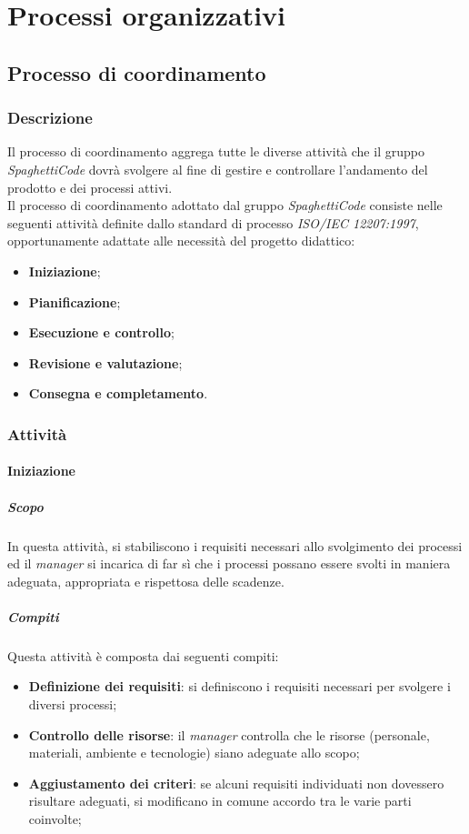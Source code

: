 \section{Processi organizzativi}
\label{sec:processi_organizativi}

\subsection{Processo di coordinamento}

\subsubsection{Descrizione}
Il processo di coordinamento aggrega tutte le diverse attività che il gruppo \emph{SpaghettiCode} dovrà svolgere al fine di gestire e controllare l'andamento del prodotto e dei processi attivi.\\

Il processo di coordinamento adottato dal gruppo \emph{SpaghettiCode} consiste nelle seguenti attività definite dallo standard di processo \emph{ISO/IEC 12207:1997}, opportunamente adattate alle necessità del progetto didattico:
\begin{itemize}
    \item \textbf{Iniziazione};
    \item \textbf{Pianificazione};
    \item \textbf{Esecuzione e controllo};
    \item \textbf{Revisione e valutazione};
    \item \textbf{Consegna e completamento}.
\end{itemize}

\subsubsection{Attività}


\paragraph{Iniziazione}
\label{par:iniziazione}
\subparagraph{Scopo}
\label{par:iniziazione:scopo}
In questa attività, si stabiliscono i requisiti necessari allo svolgimento dei processi ed il \emph{manager} si incarica di far sì che i processi possano essere svolti in maniera adeguata, appropriata e rispettosa delle scadenze.\\
\subparagraph{Compiti}
\label{par:iniziazione:compiti}
Questa attività è composta dai seguenti compiti:
\begin{itemize}
    \item \textbf{Definizione dei requisiti}: si definiscono i requisiti necessari per svolgere i diversi processi;
    \item \textbf{Controllo delle risorse}: il \emph{manager} controlla che le risorse (personale, materiali, ambiente e tecnologie) siano adeguate allo scopo;
    \item \textbf{Aggiustamento dei criteri}: se alcuni requisiti individuati non dovessero risultare adeguati, si modificano in comune accordo tra le varie parti coinvolte;
\end{itemize}

